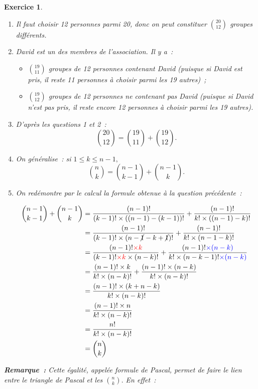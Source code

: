 \documentclass[10pt]{article}
\newtheorem{exo}{Exercice}
\begin{document}
\begin{exo}


\begin{enumerate}
\item Il faut choisir 12 personnes parmi 20, donc on peut constituer $\binom{20}{12}$ groupes différents.
\item David est un des membres de l'association. Il y a~:
\begin{itemize}
\item[\textbullet] $\binom{19}{11}$ groupes de 12 personnes contenant David (puisque si David est pris, il reste 11 personnes à choisir parmi les 19 autres)~;
\item[\textbullet] $\binom{19}{12}$ groupes de 12 personnes ne contenant pas David (puisque si David n'est pas pris, il reste encore 12 personnes à choisir parmi les 19 autres).
\end{itemize}
\item D'après les questions 1 et 2~:
\[\binom{20}{12}=\binom{19}{11}+\binom{19}{12}.\]
\item On généralise~: si $1\leq k\leq n-1,$
\[\binom{n}{k}= \binom{n-1}{k-1} + \binom{n-1}{k}.\]
\item On redémontre par le calcul la formule obtenue à la question précédente~:

\begin{align*}
\binom{n-1}{k-1} + \binom{n-1}{k}
&=\frac{(n-1)!}{(k-1)!\times ((n-1)-(k-1))!}+\frac{(n-1)!}{k!\times ((n-1)-k)!}
\\&=\frac{(n-1)!}{(k-1)!\times (n-\cancel{1}-k+\cancel{1})!}+\frac{(n-1)!}{k!\times (n-1-k)!}
\\&=\frac{(n-1)!\textcolor{red}{\times k}}{(k-1)!\textcolor{red}{\times k}\times (n-k)!}+\frac{(n-1)!\textcolor{blue}{\times (n-k)}}{k!\times (n-k-1)!\textcolor{blue}{\times (n-k)}}
\\&=\frac{(n-1)!\times k}{k!\times (n-k)!}+\frac{(n-1)!\times(n-k)}{k!\times (n-k)!}
\\&=\frac{(n-1)!\times(k+n-k)}{k!\times (n-k)!}
\\&=\frac{(n-1)!\times n}{k!\times (n-k)!}
\\&=\frac{n!}{k!\times (n-k)!}
\\&=\binom{n}{k}
\end{align*}

\end{enumerate}

\medskip

\textbf{Remarque~:} Cette égalité, appelée formule de Pascal, permet de faire le lien entre le triangle de Pascal et les $\binom{n}{k}.$ En effet~:


\end{exo}
\end{document}
